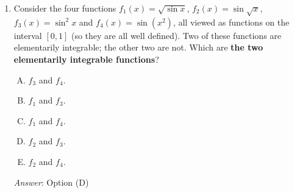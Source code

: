 \documentclass[10pt]{amsart}
\begin{document}
\begin{enumerate}
  \begin{enumerate}[(A)]
  \item $x \mapsto x \sin x$
  \item $x \mapsto x \cos x$
  \item $x \mapsto x \tan x$
  \item $x \mapsto x \sin^2x$
  \item $x \mapsto x \tan^2x$
  \end{enumerate}

  {\em Answer}: Option (C)

  {\em Explanation}: If $f$ is elementarily integrable, then $xf(x)$
  is elementarily integrable iff $f$ is twice elementarily integrable;
  this is easily seen using integration by parts. Of the function
  options given here, $\tan$ is the only function that is not twice
  elementarily integrable, because the first integration gives
  $-\ln|\cos x|$ which cannot be integrated. Of the others, note that
  $\sin$, $\cos$, and $\sin^2$ can be integrated using elementary
  functions infinitely many times. $\tan^2$ is twice elementarily
  integrable but no further: integrates the first time to $\tan x -
  x$, which integrates one more time to $-\ln|cos x| - x^2/2$, which
  cannot be integrated further.

  {\em Performance review}: $20$ out of $25$ people got this. $2$ each
  chose (D) and (E), $1$ chose (B).

  {\em Historical note (last time)}: $8$ out of $18$ people got this
  correct. $8$ people chose (E) and $2$ people chose (D).

\item Consider the four functions $f_1(x) = \sqrt{\sin x}$, $f_2(x) =
  \sin \sqrt{x}$, $f_3(x) = \sin^2 x$ and $f_4(x) = \sin(x^2)$, all
  viewed as functions on the interval $[0,1]$ (so they are all well
  defined). Two of these functions are elementarily integrable; the
  other two are not. Which are {\bf the two elementarily integrable
  functions}?

  \begin{enumerate}[(A)]
  \item $f_3$ and $f_4$.
  \item $f_1$ and $f_3$.
  \item $f_1$ and $f_4$. 
  \item $f_2$ and $f_3$.
  \item $f_2$ and $f_4$.
  \end{enumerate}

  {\em Answer}: Option (D)


\end{enumerate}
\end{document}
